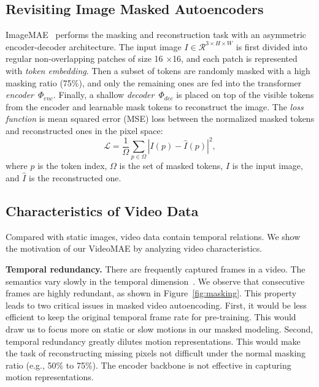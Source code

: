 \documentclass{article}
\def\x{$\times$}
\begin{document}
\subsection{Revisiting Image Masked Autoencoders}
ImageMAE~\cite{he2021masked} performs the masking and reconstruction task with an asymmetric encoder-decoder architecture. The input image $I \in \mathcal{R}^{3 \times H \times W} $ is first divided into regular non-overlapping patches of size 16 \x 16, and each patch is represented with {\em token embedding}. Then a subset of tokens are randomly masked with a high masking ratio (75\%), and only the remaining ones are fed into the transformer {\em encoder}~$ \Phi_{enc}$.
Finally, a shallow {\em decoder}~$ \Phi_{dec}$ is placed on top of the visible tokens from the encoder and learnable mask tokens to reconstruct the image.
The {\em loss function} is mean squared error (MSE) loss between the normalized masked tokens and reconstructed ones in the pixel space:
\begin{equation}
    \mathcal{L} = \frac{1}{\Omega} \sum_{p \in \Omega} |I(p) - \hat{I}(p)|^2,
\end{equation}
where $p$ is the token index, $\Omega$ is the set of masked tokens, $I$ is the input image, and $\hat{I}$ is the reconstructed one. 

\subsection{Characteristics of Video Data}
Compared with static images, video data contain temporal relations. We show the motivation of our VideoMAE by analyzing video characteristics.

\par{\noindent \textbf{Temporal redundancy.}}
There are frequently captured frames in a video. The semantics vary slowly in the temporal dimension~\cite{slowness12}. We observe that consecutive frames are highly redundant, as shown in Figure~\ref{fig:masking}. This property leads to two critical issues in masked video autoencoding. First, it would be less efficient to keep the original temporal frame rate for pre-training. This would draw us to focus more on static or slow motions in our masked modeling. Second, temporal redundancy greatly dilutes motion representations. This would make the task of reconstructing missing pixels not difficult under the normal masking ratio (e.g., 50\% to 75\%). The encoder backbone is not effective in capturing motion representations.
\end{document}
